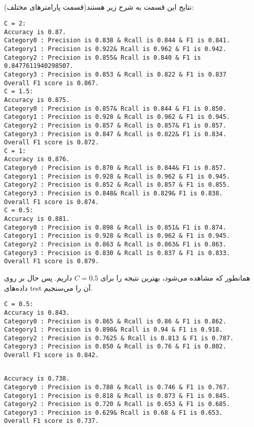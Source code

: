 \documentclass[11pt]{article}
\begin{document}
\subsection{}
نتایج این قسمت به شرح زیر هستند(قسمت پارامترهای مختلف):
\begin{latin}
\begin{lstlisting}
C = 2:
Accuracy is 0.87.
Category0 : Precision is 0.838 & Rcall is 0.844 & F1 is 0.841.
Category1 : Precision is 0.922& Rcall is 0.962 & F1 is 0.942.
Category2 : Precision is 0.855& Rcall is 0.840 & F1 is 0.8477611940298507.
Category3 : Precision is 0.853 & Rcall is 0.822 & F1 is 0.837
Overall F1 score is 0.867.
C = 1.5:
Accuracy is 0.875.
Category0 : Precision is 0.857& Rcall is 0.844 & F1 is 0.850.
Category1 : Precision is 0.928 & Rcall is 0.962 & F1 is 0.945.
Category2 : Precision is 0.857 & Rcall is 0.857& F1 is 0.857.
Category3 : Precision is 0.847 & Rcall is 0.822& F1 is 0.834.
Overall F1 score is 0.872.
C = 1:
Accuracy is 0.876.
Category0 : Precision is 0.870 & Rcall is 0.844& F1 is 0.857.
Category1 : Precision is 0.928 & Rcall is 0.962 & F1 is 0.945.
Category2 : Precision is 0.852 & Rcall is 0.857 & F1 is 0.855.
Category3 : Precision is 0.848& Rcall is 0.829& F1 is 0.838.
Overall F1 score is 0.874.
C = 0.5:
Accuracy is 0.881.
Category0 : Precision is 0.898 & Rcall is 0.851& F1 is 0.874.
Category1 : Precision is 0.928 & Rcall is 0.962 & F1 is 0.945.
Category2 : Precision is 0.863 & Rcall is 0.863& F1 is 0.863.
Category3 : Precision is 0.830 & Rcall is 0.837 & F1 is 0.833.
Overall F1 score is 0.879.
\end{lstlisting}
\end{latin}
همانطور که مشاهده می‌شود، بهترین نتیجه را برای 
$C = 0.5$
داریم. پس حال بر روی داده‌های test آن را می‌سنجیم.

\begin{latin}
\begin{lstlisting}
C = 0.5:
Accuracy is 0.843.
Category0 : Precision is 0.865 & Rcall is 0.86 & F1 is 0.862.
Category1 : Precision is 0.898& Rcall is 0.94 & F1 is 0.918.
Category2 : Precision is 0.7625 & Rcall is 0.813 & F1 is 0.787.
Category3 : Precision is 0.850 & Rcall is 0.76 & F1 is 0.802.
Overall F1 score is 0.842.
\end{lstlisting}
\end{latin}

\subsection{}
\begin{latin}
\begin{lstlisting}
Accuracy is 0.738.
Category0 : Precision is 0.788 & Rcall is 0.746 & F1 is 0.767.
Category1 : Precision is 0.818 & Rcall is 0.873 & F1 is 0.845.
Category2 : Precision is 0.720 & Rcall is 0.653 & F1 is 0.685.
Category3 : Precision is 0.629& Rcall is 0.68 & F1 is 0.653.
Overall F1 score is 0.737.
\end{lstlisting}
\end{latin}
\end{document}
